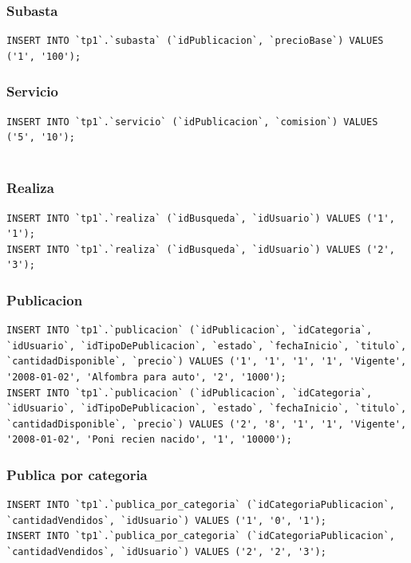 \documentclass[a4paper, 10pt, twoside]{article}
\begin{document}
\subsubsection{Subasta}
\begin{verbatim}
INSERT INTO `tp1`.`subasta` (`idPublicacion`, `precioBase`) VALUES ('1', '100');

\end{verbatim}
\subsubsection{Servicio}
\begin{verbatim}
INSERT INTO `tp1`.`servicio` (`idPublicacion`, `comision`) VALUES ('5', '10');


\end{verbatim}
\subsubsection{Realiza}
\begin{verbatim}
INSERT INTO `tp1`.`realiza` (`idBusqueda`, `idUsuario`) VALUES ('1', '1');
INSERT INTO `tp1`.`realiza` (`idBusqueda`, `idUsuario`) VALUES ('2', '3');
\end{verbatim}
\subsubsection{Publicacion}
\begin{verbatim}
INSERT INTO `tp1`.`publicacion` (`idPublicacion`, `idCategoria`, `idUsuario`, `idTipoDePublicacion`, `estado`, `fechaInicio`, `titulo`, `cantidadDisponible`, `precio`) VALUES ('1', '1', '1', '1', 'Vigente', '2008-01-02', 'Alfombra para auto', '2', '1000');
INSERT INTO `tp1`.`publicacion` (`idPublicacion`, `idCategoria`, `idUsuario`, `idTipoDePublicacion`, `estado`, `fechaInicio`, `titulo`, `cantidadDisponible`, `precio`) VALUES ('2', '8', '1', '1', 'Vigente', '2008-01-02', 'Poni recien nacido', '1', '10000');

\end{verbatim}
\subsubsection{Publica por categoria}
\begin{verbatim}
INSERT INTO `tp1`.`publica_por_categoria` (`idCategoriaPublicacion`, `cantidadVendidos`, `idUsuario`) VALUES ('1', '0', '1');
INSERT INTO `tp1`.`publica_por_categoria` (`idCategoriaPublicacion`, `cantidadVendidos`, `idUsuario`) VALUES ('2', '2', '3');

\end{verbatim}
\end{document}
